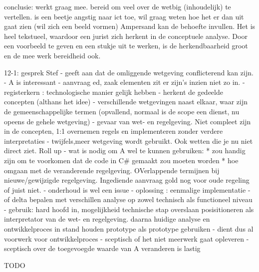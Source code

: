 conclusie: 
werkt graag mee. bereid om veel over de wetbig (inhoudelijk) te vertellen.
is een beetje angstig naar ict toe, wil graag weten hoe het er dan uit gaat zien (wil zich een beeld vormen)
Ampersand kan de behoefte invullen. Het is heel tekstueel, waardoor een jurist zich herkent in de conceptuele analyse.
Door een voorbeeld te geven en een stukje uit te werken, is de herkendbaarheid groot en de mee werk bereidheid ook.

12-1: gesprek Stef
- geeft aan dat de omliggende wetgeving conflicterend kan zijn.
- A is interessant
- aanvraag ed, zaak elementen zit er zijn's inzien niet zo in.
- registerkern : technologische manier gelijk hebben
- herkent de gedeelde concepten (althans het idee)
- verschillende wetgevingen naast elkaar, waar zijn de gemeenschappelijke termen (opvallend, normaal is de scope een dienst, nu opeens de gehele wetgeving)
- gevaar van wet- en regelgeving. Niet compleet zijn in de concepten, 1:1 overnemen regels en implementeren zonder verdere interpretaties
- twijfels,meer wetgeving wordt gebruikt. Ook wetten die je nu niet direct ziet. Roll up
- wat is nodig om A wel te kunnen  gebruiken:
* zou handig zijn om te voorkomen dat de code in C\# gemaakt zou moeten worden
* hoe omgaan met de veranderende regelgeving. OVerlappende termijnen bij nieuwe/gewijzigde regelgeving. Ingediende aanvraag gold nog voor oude regeling of juist niet.
- onderhoud is wel een issue
- oplossing : eenmalige implementatie
- of delta bepalen met verschillen analyse op zowel technisch als functioneel niveau
- gebruik: hard hoofd in, 
mogelijkheid technische stap overslaan
posisitioneren als interpretator van de wet- en regelgeving.
daarna huidige analyse en ontwikkelproces in stand houden
prototype als prototype gebruiken
- dient dus al voorwerk voor ontwikkelproces 
- sceptisch of het niet meerwerk gaat opleveren
- sceptisch over de toegevoegde waarde van A
veranderen is lastig

TODO
